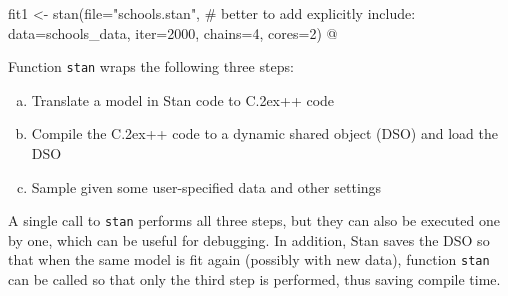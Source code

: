 \documentclass[12pt]{article}
\newcommand{\Stan}{Stan\xspace}
\newcommand*{\Cpp}{C\raise.2ex\hbox{\footnotesize ++}\xspace} %
\newcommand{\code}[1]{{\tt #1}}
\begin{document}
              fit1 <- stan(file="schools.stan", 
                           # better to add explicitly include: data=schools_data, 
                           iter=2000, chains=4, cores=2)
              @
                
                Function \code{stan} wraps the following three steps: 
                \begin{enumerate}[a.]\addtolength{\itemsep}{-0.6\baselineskip}
              \item Translate a model in \Stan code to \Cpp code 
              \item Compile the \Cpp code to a dynamic shared object (DSO) and load the DSO
              \item Sample given some user-specified data and other settings
              \end{enumerate}
              
              A single call to \code{stan} performs all three steps, but they can also be  
              executed one by one, which can be useful for debugging.   In addition, \Stan
              saves the DSO so that when the same model is fit again (possibly with new
                                                                      data), function \code{stan} can be called so that only the third step is performed, thus
              saving compile time.
              
\end{document}

